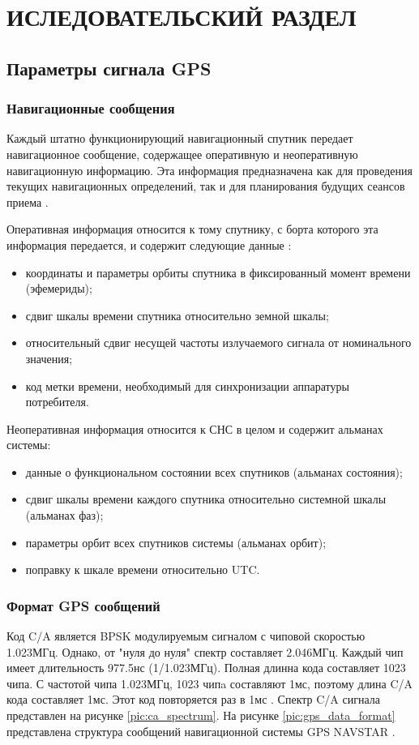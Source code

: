 \section{ИСЛЕДОВАТЕЛЬСКИЙ РАЗДЕЛ}

\subsection{Параметры сигнала GPS}
\label{razdel11}
\subsubsection{Навигационные сообщения}
Каждый штатно функционирующий навигационный спутник передает навигационное сообщение, содержащее оперативную и неоперативную
навигационную информацию. Эта информация предназначена как для проведения текущих навигационных определений, так и для
планирования будущих сеансов приема \cite{yacenkov}.

Оперативная информация относится к тому спутнику, с борта которого эта информация передается, и содержит следующие данные
\cite{yacenkov, tsui}:
\begin{itemize}
\item координаты и параметры орбиты спутника в фиксированный момент времени (эфемериды);
\item сдвиг шкалы времени спутника относительно земной шкалы;
\item относительный сдвиг несущей частоты излучаемого сигнала от номинального значения;
\item код метки времени, необходимый для синхронизации аппаратуры потребителя.
\end{itemize}

Неоперативная информация относится к СНС в целом и содержит альманах системы:
\begin{itemize}
\item данные о функциональном состоянии всех спутников (альманах состояния);
\item сдвиг шкалы времени каждого спутника относительно системной шкалы (альманах фаз);
\item параметры орбит всех спутников системы (альманах орбит);
\item поправку к шкале времени относительно UTC.
\end{itemize}

\subsubsection{Формат GPS сообщений}
Код C/A является BPSK модулируемым сигналом с чиповой скоростью 1.023МГц. Однако, от "нуля до нуля" спектр составляет
2.046МГц. Каждый чип имеет длительность 977.5нс (1/1.023МГц). Полная длинна кода составляет 1023 чипа. С частотой чипа
1.023МГц, 1023 чипa составляют 1мс, поэтому длина C/A кода составляет 1мс. Этот код повторяется раз в 1мс \cite{tsui}.
Спектр C/A сигнала представлен на рисунке \ref{pic:ca_spectrum}. На рисунке \ref{pic:gps_data_format} представлена структура
сообщений навигационной системы GPS NAVSTAR \cite{tsui}.

